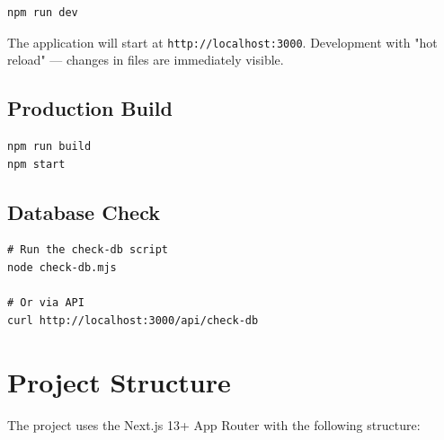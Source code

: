 \begin{verbatim}
npm run dev
\end{verbatim}

The application will start at \texttt{http://localhost:3000}. Development with "hot reload" — changes in files are immediately visible.

\subsection{Production Build}

\begin{verbatim}
npm run build
npm start
\end{verbatim}

\subsection{Database Check}

\begin{verbatim}
# Run the check-db script
node check-db.mjs

# Or via API
curl http://localhost:3000/api/check-db
\end{verbatim}

\section{Project Structure}

The project uses the Next.js 13+ App Router with the following structure:

